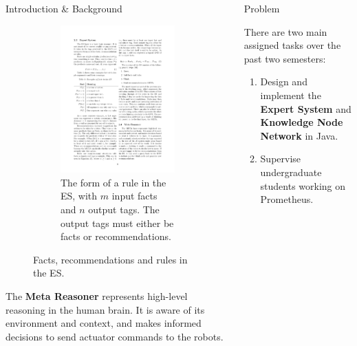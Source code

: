\documentclass[final]{beamer} %
\newlength{\columnheight}
\begin{document}
\begin{frame}
\begin{columns}
\begin{column}{.33\textwidth}
{\begin{block}{Introduction \& Background}
{\begin{figure}[!htb]
\begin{subfigure}[!htb]{0.58\columnwidth}
							\includegraphics[width=\columnwidth]{figures/rule.pdf}
							\caption{The form of a rule in the ES, with $m$ input facts and $n$ output tags. The output tags must either be facts or recommendations.}
						\end{subfigure}
						\caption{Facts, recommendations and rules in the ES.}
					\end{figure}
					
					
					The \textbf{Meta Reasoner} represents high-level reasoning in the human brain. It is aware of its environment and context, and makes informed decisions to send actuator commands to the robots.}
				\end{block}
			}
			\end{column}
			\begin{column}{.33\textwidth}
				\parbox[t][\columnheight]{\textwidth}{
				
				\begin{block}{Problem}
					\parbox{0.99\textwidth}{
					There are two main assigned tasks over the past two semesters:
					\begin{enumerate}
						\item Design and implement the \textbf{Expert System} and \textbf{Knowledge Node Network} in Java.
						\item Supervise undergraduate students working on Prometheus.
				\end{enumerate}}
				\end{block}
					
}
\end{column}
\end{columns}
\end{frame}
\end{document}
